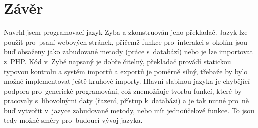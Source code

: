 \documentclass[a4paper,12pt]{article}
\begin{document}
\section{Závěr}
Navrhl jsem programovací jazyk Zyba a zkonstruován jeho překladač. Jazyk lze použít pro~psaní webových stránek, přičemž funkce pro~interakci s~okolím jsou buď obsaženy jako zabudované metody (práce s~databází) nebo je lze importovat z~PHP. Kód v~Zybě napsaný je dobře čitelný, překladač provádí statickou typovou kontrolu a systém importů a exportů je poměrně silný, třebaže by bylo možné implementovat ještě kruhové importy. Hlavní slabinou jazyka je chybějící podpora pro~generické programování, což znemožňuje tvorbu funkcí, které by pracovaly s~libovolnými daty (řazení, přístup k~databázi) a je tak nutné pro~ně buď vytvořit v~jazyce zabudované metody, nebo mít jednoúčelové funkce. To jsou tedy možné směry pro~budoucí vývoj jazyka.

\newpage
\printbibliography[heading=bibintoc, title={Použitá literatura}]
\newpage
\end{document}
